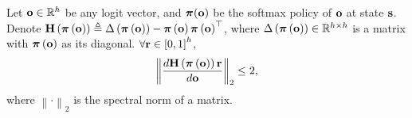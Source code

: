 \begin{lem}
\label{lem:Hr_spectral_norm_upper_bound}
    Let ${\mathbf{o}} \in {\mathbb{R}}^h$ be any logit vector, and ${\boldsymbol{\pi}}({\mathbf{o}})$ be the softmax policy of ${\mathbf{o}}$ at state ${\mathbf{s}}$. Denote ${\mathbf{H}}\left( {\boldsymbol{\pi}} \left({\mathbf{o}} \right) \right) \triangleq \Delta \left( {\boldsymbol{\pi}} \left({\mathbf{o}} \right) \right) - {\boldsymbol{\pi}} \left({\mathbf{o}} \right) {\boldsymbol{\pi}} \left({\mathbf{o}} \right)^\top$, where $\Delta \left( {\boldsymbol{\pi}} \left({\mathbf{o}} \right) \right) \in {\mathbb{R}}^{h \times h}$ is a matrix with ${\boldsymbol{\pi}} \left({\mathbf{o}} \right)$ as its diagonal. $\forall {\mathbf{r}} \in \left[ 0, 1\right]^h$,
\begin{equation*}
    \left\| \frac{d {\mathbf{H}}\left( {\boldsymbol{\pi}} \left({\mathbf{o}} \right) \right) {\mathbf{r}}}{d {\mathbf{o}} } \right\|_2 \le 2,
\end{equation*}
where $\left\| \cdot \right\|_2$ is the spectral norm of a matrix.
\end{lem}
